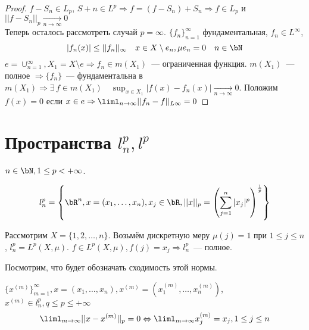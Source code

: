 \documentclass[document]{subfiles}
\begin{document}
\begin{proof}
    $f - S_n \in L_p$, $S+n \in L^p \Rightarrow f = (f - S_n) + S_n \Rightarrow f \in L_p$ и $ ||f - S_n||_p \underset{n \to \infty}{\longrightarrow} 0$ \\
    Теперь осталось рассмотреть случай $p = \infty$. $\{ f_n \}^\infty_{n=1}$ фундаментальная, $f_n \in L^\infty$, 
    \[ |f_n(x)| \leq ||f_n||_\infty \quad x \in X \setminus e_n, \mu e_n = 0 \quad n \in \bN \]
    $ e = \cup^\infty_{n=1}, X_1 = X \setminus e \Rightarrow f_n \in m(X_1)$~--- ограниченная функция. $m(X_1)$~--- полное $\Rightarrow \{f_n\}$~--- фундаментальна в 
    $m(X_1) \Rightarrow \exists \, f \in m(X_1) \quad \sup_{x \in X_1} |f(x) - f_n(x)| \underset{n \to \infty}{\longrightarrow} 0$. Положим
    $f(x) = 0$ если $x \in e \Rightarrow \liml_{n \to \infty} ||f_n - f||_{L\infty} = 0 $
 \end{proof}

 \section{Пространства $l_n^p, l^p$}

 $n \in \bN, 1 \leq p < +\infty$.
 \begin{definition}
    \[ l^p_n = \left\{ \bR^n, x = (x_1, \ldots, x_n), x_j \in \bR, ||x||_p = \left( \sum^n_{j=1} |x_j|^p\right)^{\frac{1}{p}} \right\} \]
 \end{definition}
Рассмотрим $X = \{ 1,2, \ldots, n\}$. Возьмём дискретную меру $\mu(j) = 1$ при $1 \leq j \leq n$, $l^p_n = L^p(X, \mu)$.
$f \in L^p(X, \mu), f(j) = x_j \Rightarrow l^p_n$~--- полное.

Посмотрим, что будет обозначать сходимость этой нормы.

\begin{theorem}
    $\{ x^{(m)} \}^\infty_{m=1}, x = (x_1, \ldots, x_n), x^{(m)} = (x_1^{(m)}, \ldots, x_n^{(m)})$, $x^{(m)} \in l^p_n, q \leq p \leq + \infty$
    \[ \liml_{m \to \infty} ||x - x^{(m)}||_p = 0 \Leftrightarrow \liml_{m \to \infty} x_j^{(m)} = x_j, 1 \leq j \leq n \]
\end{theorem}
\end{document}
